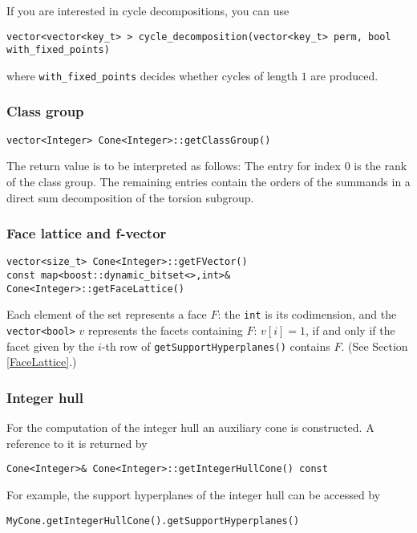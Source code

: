 \documentclass[12pt,a4paper]{scrartcl}
\theoremstyle{definition}
\begin{document}
\begin{small}
If you are interested in cycle decompositions, you can use
\begin{Verbatim}
vector<vector<key_t> > cycle_decomposition(vector<key_t> perm, bool with_fixed_points)
 \end{Verbatim}
 where \verb|with_fixed_points| decides whether cycles of length $1$ are produced.
 
\subsubsection{Class group}

\begin{Verbatim}
vector<Integer> Cone<Integer>::getClassGroup()
\end{Verbatim}
The return value is to be interpreted as follows: The entry for index $0$ is the rank of the class group. The remaining entries contain the orders of the summands in a direct sum decomposition of the torsion subgroup.

\subsubsection{Face lattice and f-vector}
\begin{Verbatim}
vector<size_t> Cone<Integer>::getFVector()
const map<boost::dynamic_bitset<>,int>& Cone<Integer>::getFaceLattice()
\end{Verbatim}
Each element of the set represents a face $F$: the \verb|int| is its codimension, and the \verb|vector<bool>| $v$ represents the facets containing $F$: $v[i]=1$, if and only if the  facet given by the $i$-th row of \verb|getSupportHyperplanes()| contains $F$. (See Section \ref{FaceLattice}.)

\subsubsection{Integer hull}

For the computation of the integer hull an auxiliary cone is constructed. A reference to it is returned by
\begin{Verbatim}
Cone<Integer>& Cone<Integer>::getIntegerHullCone() const
\end{Verbatim}

For example, the support hyperplanes of the integer hull can be accessed by
\begin{Verbatim}
MyCone.getIntegerHullCone().getSupportHyperplanes()
\end{Verbatim}


\end{small}
\end{document}
